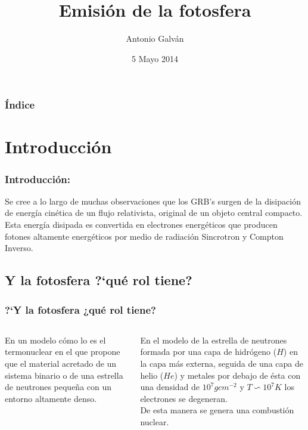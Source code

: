 \documentclass{beamer}
\title[Emisi\'on de la fotosfera]{\textbf{Emisi\'on de la fotosfera}}
\author{Antonio Galv\'an}
\date{5 Mayo 2014}
\institute{Instituto de Astronom\'ia\\ Facultad
 de Ciencias\\ U.N.A.M.}
\begin{document}
\begin{frame}
\titlepage
\end{frame}


\begin{frame}
\frametitle{\'Indice}
\tableofcontents
\end{frame}



\section{Introducci\'on}

\begin{frame}
\frametitle{Introducci\'on:} 
Se cree a lo largo de muchas observaciones que los GRB's surgen 
de la disipaci\'on de energ\'ia cin\'etica de un flujo relativista,
 original de un objeto central compacto.\\
Esta energ\'ia disipada es convertida en electrones energ\'eticos que
producen fotones altamente energ\'eticos por medio de radiaci\'on Sincrotron y 
Compton Inverso.
\end{frame}




\subsection{Y la fotosfera ?`qu\'e rol tiene?}
\begin{frame}
\frametitle{?`Y la fotosfera ¿qu\'e rol tiene?}
	\begin{columns}
	
		\begin{column}{5cm}
		En un modelo c\'omo lo es el termonuclear en el que propone que el material acretado
		de un sistema binario o de una estrella de neutrones peque\~na con un entorno altamente
		denso.
		\end{column}
		
		\begin{column}{5cm}
		En el modelo de la estrella de neutrones formada por una capa de hidr\'ogeno ($H$) en la capa
		m\'as externa, seguida de una capa de helio ($He$) y metales por debajo de \'esta con una densidad
		de $10^{7}g cm^{-2}$ y $T\backsim 10^{7}K $ los electrones se degeneran.\\
		De esta manera se genera una combusti\'on nuclear.
		\end{column}	
	\end{columns}
\end{frame}
\end{document}
